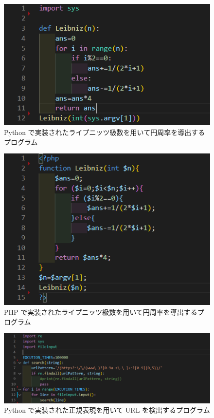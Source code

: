 \begin{figure}[tb]
    \centering
    \includegraphics[width=13.5cm,keepaspectratio]{figure/p-py.PNG}
    \caption{Python で実装されたライプニッツ級数を用いて円周率を導出するプログラム}
    \label{fig:p-py}
\end{figure}

\begin{figure}[tbp]
    \centering
    \includegraphics[width=13.5cm,keepaspectratio]{figure/p-php.PNG}
    \caption{PHP で実装されたライプニッツ級数を用いて円周率を導出するプログラム}
    \label{fig:p-php}
\end{figure}

\begin{figure}[tbp]
    \centering
        \includegraphics[width=13.5cm,keepaspectratio]{figure/s-py.PNG}
        \caption{Python で実装された正規表現を用いて URL を検出するプログラム}
        \label{fig:s-py}
\end{figure}

